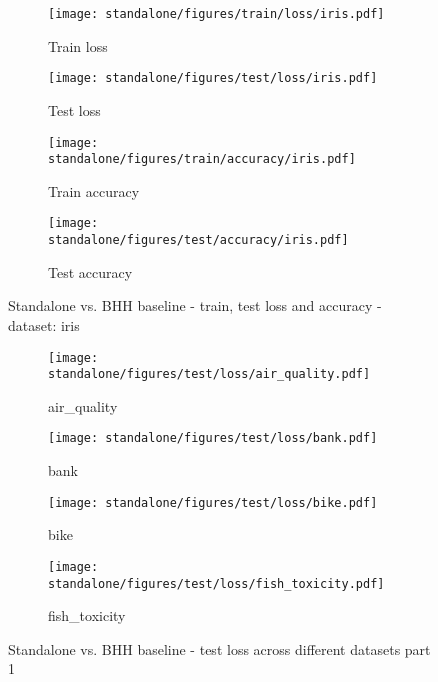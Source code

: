 \begin{figure}[htbp]
	\begin{subfigure}{0.5\textwidth}
		\centering
		\texttt{[image: standalone/figures/train/loss/iris.pdf]}
		\caption{Train loss}
		\label{fig:results:standalone:figures:loss:train:iris}
	\end{subfigure}
	\begin{subfigure}{0.5\textwidth}
		\centering
		\texttt{[image: standalone/figures/test/loss/iris.pdf]}
		\caption{Test loss}
		\label{fig:results:standalone:figures:loss:test:iris}
	\end{subfigure}
	\par\bigskip
	\begin{subfigure}{0.5\textwidth}
		\centering
		\texttt{[image: standalone/figures/train/accuracy/iris.pdf]}
		\caption{Train accuracy}
		\label{fig:results:standalone:figures:accuracy:train:iris}
	\end{subfigure}
	\begin{subfigure}{0.5\textwidth}
		\centering
		\texttt{[image: standalone/figures/test/accuracy/iris.pdf]}
		\caption{Test accuracy}
		\label{fig:results:standalone:figures:accuracy:test:iris}
	\end{subfigure}
	\par\bigskip
	\caption{Standalone vs. \Acs{BHH} baseline - train, test loss and accuracy - dataset: iris}
	\label{fig:results:standalone:figures:iris}
\end{figure}

\begin{figure}[htbp]
	\begin{subfigure}{0.48\textwidth}
		\centering
		\texttt{[image: standalone/figures/test/loss/air\_quality.pdf]}
		\caption{air\_quality}
		\label{fig:results:standalone:figures:test:loss:air_quality}
	\end{subfigure}
	\begin{subfigure}{0.48\textwidth}
		\centering
		\texttt{[image: standalone/figures/test/loss/bank.pdf]}
		\caption{bank}
		\label{fig:results:standalone:figures:test:loss:bank}
	\end{subfigure}
	\begin{subfigure}{0.48\textwidth}
		\centering
		\texttt{[image: standalone/figures/test/loss/bike.pdf]}
		\caption{bike}
		\label{fig:results:standalone:figures:test:loss:bike}
	\end{subfigure}
	\begin{subfigure}{0.48\textwidth}
		\centering
		\texttt{[image: standalone/figures/test/loss/fish\_toxicity.pdf]}
		\caption{fish\_toxicity}
		\label{fig:results:standalone:figures:test:loss:fish_toxicity}
	\end{subfigure}
	\caption{Standalone vs. \Acs{BHH} baseline - test loss across different datasets part 1}
	\label{fig:results:standalone:figures:test:loss:various1}
\end{figure}

